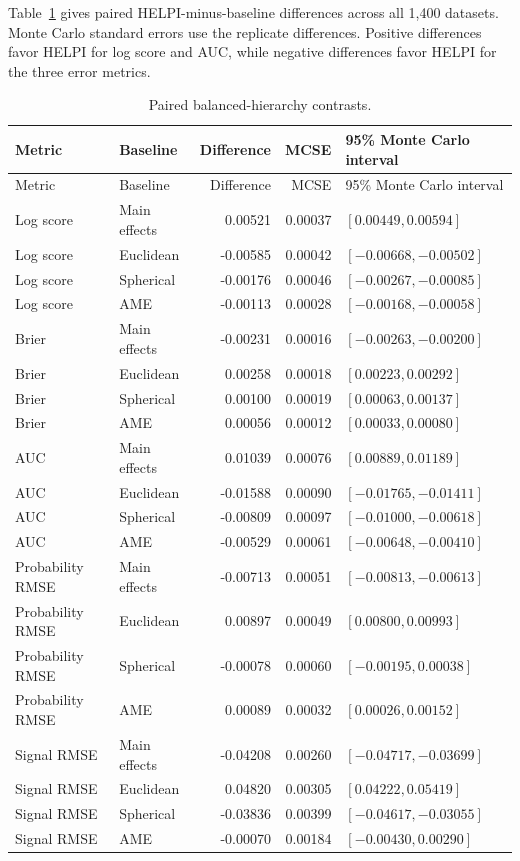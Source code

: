 \documentclass[
  12pt]{article}
\theoremstyle{definition}
\theoremstyle{plain}
\begin{document}
Table~\ref{tab:balanced-paired} gives paired HELPI-minus-baseline differences across all 1,400 datasets. Monte Carlo standard errors use the replicate differences. Positive differences favor HELPI for log score and AUC, while negative differences favor HELPI for the three error metrics.

\begingroup
\small
\setlength{\tabcolsep}{5pt}
\begin{longtable}{@{}llrrl@{}}
	\caption{Paired balanced-hierarchy contrasts.}\label{tab:balanced-paired}\\
	\toprule
	Metric & Baseline & Difference & MCSE & 95\% Monte Carlo interval \\
	\midrule
	\endfirsthead
	\toprule
	Metric & Baseline & Difference & MCSE & 95\% Monte Carlo interval \\
	\midrule
	\endhead
	Log score & Main effects & 0.00521 & 0.00037 & $[0.00449,0.00594]$ \\
	Log score & Euclidean & -0.00585 & 0.00042 & $[-0.00668,-0.00502]$ \\
	Log score & Spherical & -0.00176 & 0.00046 & $[-0.00267,-0.00085]$ \\
	Log score & AME & -0.00113 & 0.00028 & $[-0.00168,-0.00058]$ \\
	\addlinespace
	Brier & Main effects & -0.00231 & 0.00016 & $[-0.00263,-0.00200]$ \\
	Brier & Euclidean & 0.00258 & 0.00018 & $[0.00223,0.00292]$ \\
	Brier & Spherical & 0.00100 & 0.00019 & $[0.00063,0.00137]$ \\
	Brier & AME & 0.00056 & 0.00012 & $[0.00033,0.00080]$ \\
	\addlinespace
	AUC & Main effects & 0.01039 & 0.00076 & $[0.00889,0.01189]$ \\
	AUC & Euclidean & -0.01588 & 0.00090 & $[-0.01765,-0.01411]$ \\
	AUC & Spherical & -0.00809 & 0.00097 & $[-0.01000,-0.00618]$ \\
	AUC & AME & -0.00529 & 0.00061 & $[-0.00648,-0.00410]$ \\
	\addlinespace
	Probability RMSE & Main effects & -0.00713 & 0.00051 & $[-0.00813,-0.00613]$ \\
	Probability RMSE & Euclidean & 0.00897 & 0.00049 & $[0.00800,0.00993]$ \\
	Probability RMSE & Spherical & -0.00078 & 0.00060 & $[-0.00195,0.00038]$ \\
	Probability RMSE & AME & 0.00089 & 0.00032 & $[0.00026,0.00152]$ \\
	\addlinespace
	Signal RMSE & Main effects & -0.04208 & 0.00260 & $[-0.04717,-0.03699]$ \\
	Signal RMSE & Euclidean & 0.04820 & 0.00305 & $[0.04222,0.05419]$ \\
	Signal RMSE & Spherical & -0.03836 & 0.00399 & $[-0.04617,-0.03055]$ \\
	Signal RMSE & AME & -0.00070 & 0.00184 & $[-0.00430,0.00290]$ \\
	\bottomrule
\end{longtable}
\end{document}
